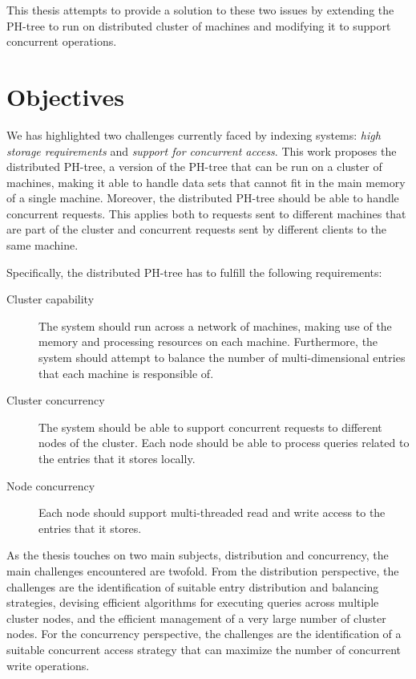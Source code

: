 \documentclass[11pt,a4paper]{globis-book}
\begin{document}
This thesis attempts to provide a solution to these two issues by extending the PH-tree to run on distributed cluster of machines and modifying it to support concurrent operations.

\section{Objectives}
\label{sec:intro-objectives}
We has highlighted two challenges currently faced by indexing systems: \textit{high storage requirements} and \textit{support for concurrent access}. This work proposes the distributed PH-tree, a version of the PH-tree that can be run on a cluster of machines, making it able to handle data sets that cannot fit in the main memory of a single machine. Moreover, the distributed PH-tree should be able to handle concurrent requests. This applies both to requests sent to different machines that are part of the cluster and concurrent requests sent by different clients to the same machine. 

Specifically, the distributed PH-tree has to fulfill the following requirements:
\begin{description}
    \item[Cluster capability] The system should run across a network of machines, making use of the memory and processing resources on each machine. Furthermore, the system should attempt to balance the number of multi-dimensional entries that each machine is responsible of.
    \item[Cluster concurrency] The system should be able to support concurrent requests to different nodes of the cluster. Each node should be able to process queries related to the entries that it stores locally.
    \item[Node concurrency] Each node should support multi-threaded read and write access to the entries that it stores.
\end{description} 

As the thesis touches on two main subjects, distribution and concurrency, the main challenges encountered are twofold. From the distribution perspective, the challenges are the identification of suitable entry distribution and balancing strategies, devising efficient algorithms for executing queries across multiple cluster nodes, and the efficient management of a very large number of cluster nodes. For the concurrency perspective, the challenges are the identification of a suitable concurrent access strategy that can maximize the number of concurrent write operations.
\end{document}
